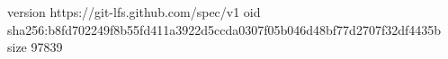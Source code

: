 version https://git-lfs.github.com/spec/v1
oid sha256:b8fd702249f8b55fd411a3922d5ccda0307f05b046d48bf77d2707f32df4435b
size 97839
